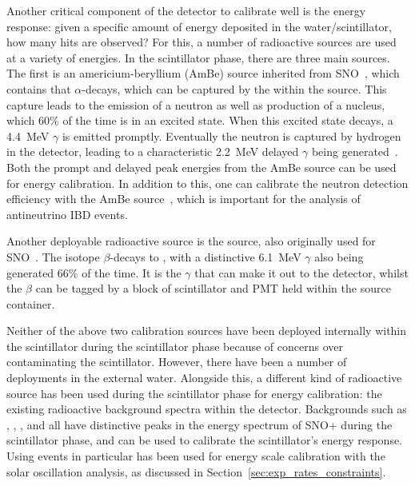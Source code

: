 Another critical component of the detector to calibrate well is the energy response: given a specific amount of energy deposited in the water/scintillator, how many hits are observed? For this, a number of radioactive sources are used at a variety of energies. In the scintillator phase, there are three main sources. The first is an americium-beryllium (AmBe) source inherited from SNO~\cite{loachMeasurementFlux8B2008}, %
which contains  that $\alpha$-decays, which can be captured by the  within the source. This capture leads to the emission of a neutron as well as production of a  nucleus, which 60\% of the time is in  an excited state. When this excited state decays, a \SI{4.4}{\MeV} $\gamma$ is emitted promptly. Eventually the neutron is captured by hydrogen in the detector, leading to a characteristic \SI{2.2}{\MeV} delayed $\gamma$ being generated~\cite{albaneseSNOExperiment2021}. %
Both the prompt and delayed peak energies from the AmBe source can be used for energy calibration. In addition to this, one can calibrate the neutron detection efficiency with the AmBe source~\cite{loachMeasurementFlux8B2008}, %
which is important for the analysis of antineutrino IBD events. %

Another deployable radioactive source is the  source, also originally used for SNO~\cite{dragowsky16NCalibrationSource2002}. %
The  isotope $\beta$-decays to , with a distinctive \SI{6.1}{\MeV} $\gamma$ also being generated 66\% of the time. It is the $\gamma$ that can make it out to the detector, whilst the $\beta$ can be tagged by a block of scintillator and PMT held within the source container.

Neither of the above two calibration sources have been deployed internally within the scintillator during the scintillator phase because of concerns over contaminating the scintillator. However, there have been a number of deployments in the external water. Alongside this, a different kind of radioactive source has been used during the scintillator phase for energy calibration: the existing radioactive background spectra within the detector. Backgrounds such as , , , and  all have distinctive peaks in the energy spectrum of SNO+ during the scintillator phase, and can be used to calibrate the scintillator's energy response. Using  events in particular has been used for energy scale calibration with the solar oscillation analysis, as discussed in Section~\ref{sec:exp_rates_constraints}.

